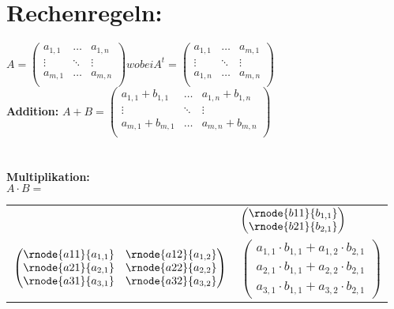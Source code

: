 \section*{Rechenregeln:}
$A = 
\begin{pmatrix}
a_{1,1} & \dots  & a_{1,n} \\
\vdots  & \ddots & \vdots  \\
a_{m,1} & \dots  & a_{m,n} \\
\end{pmatrix}
wobei A^t =
\begin{pmatrix}
a_{1,1} & \dots  & a_{m,1} \\
\vdots  & \ddots & \vdots  \\
a_{1,n} & \dots  & a_{m,n} \\
\end{pmatrix}
$
\\
\textbf{Addition:} $A + B =
\begin{pmatrix}
a_{1,1} + b_{1,1} & \dots  & a_{1,n} + b_{1,n} \\
\vdots  	& \ddots & 		 \vdots \\
a_{m,1} + b_{m,1} & \dots  & a_{m,n} + b_{m,n} \\
\end{pmatrix}
$\\\\\\
\textbf{Multiplikation:} \\$A \cdot B =$
\begin{tabular}{c l} 
  & $ 
  \begin{pmatrix} 
  \rnode{b11}{b_{1,1}} \\ 
  \rnode{b21}{b_{2,1}}
  \end{pmatrix}$ \\
  $ \begin{pmatrix} 
  \rnode{a11}{a_{1,1}} & \rnode{a12}{a_{1,2}} \\ 
  \rnode{a21}{a_{2,1}} & \rnode{a22}{a_{2,2}} \\ 
  \rnode{a31}{a_{3,1}} & \rnode{a32}{a_{3,2}} 
  \end{pmatrix} $ & 
  $ \begin{pmatrix} 
  a_{1,1} \cdot b_{1,1} + a_{1,2} \cdot b_{2,1} \\ 
  a_{2,1} \cdot b_{1,1} + a_{2,2} \cdot b_{2,1} \\
  a_{3,1} \cdot b_{1,1} + a_{3,2} \cdot b_{2,1}
  \end{pmatrix} $ 
\end{tabular}\\
